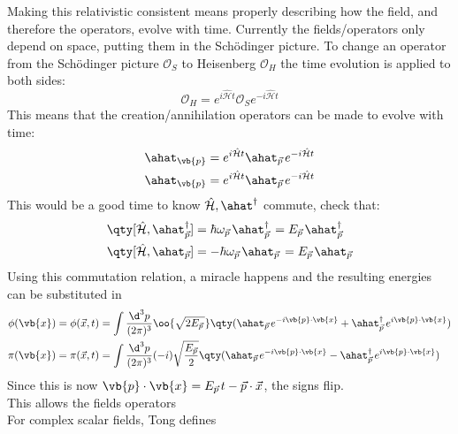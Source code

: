 Making this relativistic consistent means properly describing how the field, and therefore the operators, evolve with time. Currently the fields/operators only depend on space, putting them in the Sch\"odinger picture. To change an operator from the Sch\"odinger picture \(\mathcal{O}_{S}\) to Heisenberg \(\mathcal{O}_{H}\) the time evolution is applied to both sides:
\begin{equation}
	\mathcal{O}_{H} = e^{i\hat{\mathcal{H}}t}\mathcal{O}_{S}e^{-i\hat{\mathcal{H}}t}
\end{equation}
This means that the creation/annihilation operators can be made to evolve with time:
\begin{align*}
	\ahat_{\vb{p}}&=e^{i\hat{\mathcal{H}}t}\ahat_{\ppp}e^{-i\hat{\mathcal{H}}t}
	\\
	\ahat_{\vb{p}}&=e^{i\hat{\mathcal{H}}t}\ahat_{\ppp}e^{-i\hat{\mathcal{H}}t}
\end{align*}
This would be a good time to know \(\hat{\mathcal{H}},\ahat^{\dagger}\) commute, check that:
\begin{align}
	\qty[\hat{\mathcal{H}},\ahat^{\dagger}_{\vec{p}}]
	&= \hbar\omega_{\ppp}\ahat^{\dagger}_{\ppp}
	 = E_{\ppp}\ahat_{\vec{p}}^{\dagger}
	\\
	\qty[\hat{\mathcal{H}},\ahat_{\vec{p}}]
	&=-\hbar\omega_{\ppp}\ahat_{\ppp}
	=E_{\ppp}\ahat_{\vec{p}}
\end{align}
Using this commutation relation, a miracle happens and the resulting energies can be substituted in
\begin{align}
	\phi(\vb{x})=\phi(\vec{x},t)&=\int
	\frac{\d^3p}{(2\pi)^3}
	\oo{\sqrt{2E_{\ppp}}}
	\qty(
		\ahat_{\ppp}e^{-i\vb{p}\cdot\vb{x}}
		+
		\ahat_{\vec{p}}^{\dagger}\,e^{i\vb{p}\cdot\vb{x}}
	)\label{eqn:}
	\\
	\pi(\vb{x})=\pi(\vec{x},t)&=\int\frac{\d^3p}{(2\pi)^3}
	(-i)\sqrt{\frac{E_{\vec{p}}}{2}}
	\qty(
		\ahat_{\ppp}e^{-i\vb{p}\cdot\vb{x}}
		-
		\ahat_{\vec{p}}^{\dagger}\,e^{i\vb{p}\cdot\vb{x}}
	)
\end{align}
Since this is now \(\vb{p}\cdot\vb{x}=E_{\ppp}t-\vec{p}\cdot\vec{x}\), the signs flip.
\\
This allows the fields operators \\
For complex scalar fields, Tong defines

